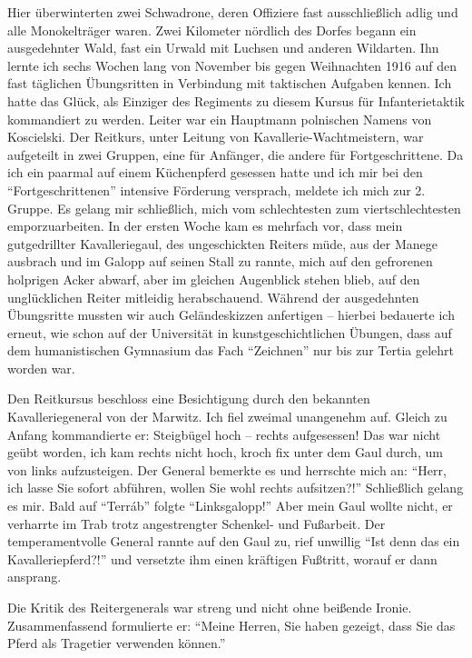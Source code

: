 \documentclass[a5paper,pagesize,10pt,twoside=true]{scrbook}
\begin{document}
Hier überwinterten zwei Schwadrone, deren Offiziere fast ausschließlich adlig und alle Monokelträger waren. Zwei Kilometer nördlich des Dorfes begann ein ausgedehnter Wald, fast ein Urwald mit Luchsen und anderen Wildarten. Ihn lernte ich sechs Wochen lang von November bis gegen Weihnachten 1916 auf den fast täglichen Übungsritten in Verbindung mit taktischen Aufgaben kennen. Ich hatte das Glück, als Einziger des Regiments zu diesem Kursus für Infanterietaktik kommandiert zu werden. Leiter war ein Hauptmann polnischen Namens von Koscielski. Der Reitkurs, unter Leitung von Kavallerie-Wachtmeistern, war aufgeteilt in zwei Gruppen, eine für Anfänger, die andere für Fortgeschrittene. Da ich ein paarmal auf einem Küchenpferd gesessen hatte und ich mir bei den \enquote{Fortgeschrittenen} intensive Förderung versprach, meldete ich mich zur 2. Gruppe. Es gelang mir schließlich, mich vom schlechtesten zum viertschlechtesten emporzuarbeiten. In der ersten Woche kam es mehrfach vor, dass mein gutgedrillter Kavalleriegaul, des ungeschickten Reiters müde, aus der Manege ausbrach und im Galopp auf seinen Stall zu rannte, mich auf den gefrorenen holprigen Acker abwarf, aber im gleichen Augenblick stehen blieb, auf den unglücklichen Reiter mitleidig herabschauend. Während der ausgedehnten Übungsritte mussten wir auch Geländeskizzen anfertigen -- hierbei bedauerte ich erneut, wie schon auf der Universität in kunstgeschichtlichen Übungen, dass auf dem humanistischen Gymnasium das Fach \enquote{Zeichnen} nur bis zur Tertia gelehrt worden war.

Den Reitkursus beschloss eine Besichtigung durch den bekannten Kavalleriegeneral von der Marwitz. Ich fiel zweimal unangenehm auf. Gleich zu Anfang kommandierte er: Steigbügel hoch -- rechts aufgesessen! Das war nicht geübt worden, ich kam rechts nicht hoch, kroch fix unter dem Gaul durch, um von links aufzusteigen. Der General bemerkte es und herrschte mich an: \enquote{Herr, ich lasse Sie sofort abführen, wollen Sie wohl rechts aufsitzen?!} Schließlich gelang es mir. Bald auf \enquote{Terráb} folgte \enquote{Linksgalopp!} Aber mein Gaul wollte nicht, er verharrte im Trab trotz angestrengter Schenkel- und Fußarbeit. Der temperamentvolle General rannte auf den Gaul zu, rief unwillig \enquote{Ist denn das ein Kavalleriepferd?!} und versetzte ihm einen kräftigen Fußtritt, worauf er dann ansprang.

Die Kritik des Reitergenerals war streng und nicht ohne beißende Ironie. Zusammenfassend formulierte er: \enquote{Meine Herren, Sie haben gezeigt, dass Sie das Pferd als Tragetier verwenden können.}
\end{document}
